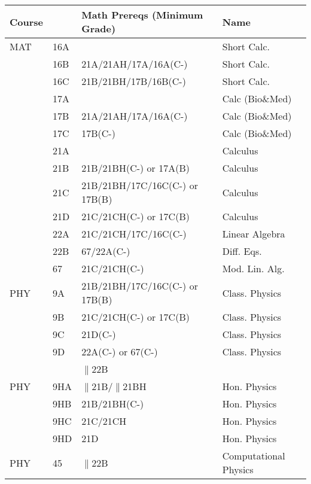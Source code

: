 \documentclass[12pt]{article}
\begin{document}
\newpage
{}
\label{tbl:math-prereqs}
\begin{center}
\begin{tabular}{|llll|}
\hline
Course & & Math Prereqs (Minimum Grade)& Name \\
\hline
MAT & 16A & & Short Calc.\\
    & 16B & 21A/21AH/17A/16A(C-) & Short Calc.\\
    & 16C & 21B/21BH/17B/16B(C-) & Short Calc.\\
    & 17A &                      & Calc (Bio\&Med)\\
    & 17B & 21A/21AH/17A/16A(C-) & Calc (Bio\&Med)\\
    & 17C & 17B(C-)              & Calc (Bio\&Med)\\
    & 21A &                      & Calculus \\
    & 21B & 21B/21BH(C-) or 17A(B) & Calculus \\
    & 21C & 21B/21BH/17C/16C(C-) or 17B(B) & Calculus\\
    & 21D & 21C/21CH(C-) or 17C(B) & Calculus \\
    & 22A & 21C/21CH/17C/16C(C-)    & Linear Algebra \\
    & 22B & 67/22A(C-)           & Diff. Eqs. \\
    & 67  & 21C/21CH(C-)           & Mod. Lin. Alg. \\
\hline
\hline
PHY & 9A & 21B/21BH/17C/16C(C-) or 17B(B) & Class. Physics\\
    & 9B & 21C/21CH(C-) or 17C(B) & Class. Physics\\
    & 9C & 21D(C-) & Class. Physics\\
    & 9D & 22A(C-) or 67(C-) & Class. Physics\\
    &    & $\parallel$22B & \\
\hline
\hline
PHY & 9HA & $\parallel$21B/$\parallel$21BH & Hon. Physics\\
    & 9HB    & 21B/21BH(C-) & Hon. Physics \\
    & 9HC    & 21C/21CH & Hon. Physics \\
    & 9HD    & 21D  & Hon. Physics \\
\hline
PHY & 45     & $\parallel$22B & Computational Physics \\
\hline
\end{tabular}
\end{center}
\end{document}
